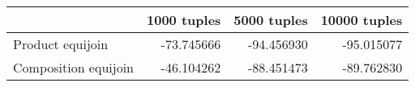 \begin{tabular}{lrrr}
\toprule
 & 1000 tuples & 5000 tuples & 10000 tuples \\
\midrule
Product equijoin & -73.745666 & -94.456930 & -95.015077 \\
Composition equijoin & -46.104262 & -88.451473 & -89.762830 \\
\bottomrule
\end{tabular}
